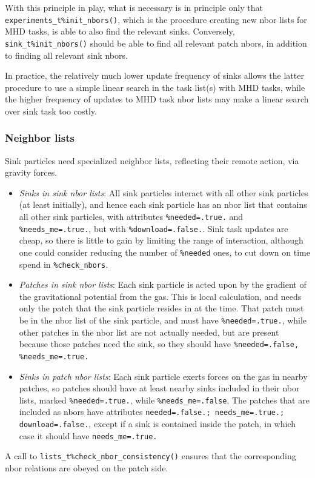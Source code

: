 \documentclass[paper=a4,fontsize=11pt]{scrartcl}
\numberwithin{equation}{section}		%
\numberwithin{figure}{section}			%
\numberwithin{table}{section}				%
\newcommand{\codecolor}{\color{Blue}}
\newcommand{\Code}[1]{{\codecolor\texttt{#1}}}
\begin{document}
With this principle in play, what is necessary is in principle only that \Code{experiments\_t\%init\_nbors()}, which is the procedure creating new nbor lists for MHD tasks, is able to also find the relevant sinks.  Conversely, \Code{sink\_t\%init\_nbors()} should be able to find all relevant patch nbors, in addition to finding all relevant sink nbors.

In practice, the relatively much lower update frequency of sinks allows the latter procedure to use a simple linear search in the task list(s) with MHD tasks, while the higher frequency of updates to MHD task nbor lists may make a linear search over sink task too costly.

\subsubsection{Neighbor lists}
Sink particles need specialized neighbor lists, reflecting their remote action, via gravity forces.  
\begin{itemize}
    \item \textit{Sinks in sink nbor lists}: All sink particles interact with all other sink particles (at least initially), and hence each sink particle has an nbor list that contains all other sink particles, with attributes \verb|%needed=.true.| and \verb|%needs_me=.true.|, but with \verb|%download=.false.|.  Sink task updates are cheap, so there is little to gain by limiting the range of interaction, although one could consider reducing the number of \verb|%needed| ones, to cut down on time spend in \verb|%check_nbors|.
    \item \textit{Patches in sink nbor lists}: Each sink particle is acted upon by the gradient of the gravitational potential from the gas.  This is local calculation, and needs only the patch that the sink particle resides in at the time.  That patch must be in the nbor list of the sink particle, and must have \verb|%needed=.true.|, while other patches in the nbor list are not actually needed, but are present because those patches need the sink, so they should have \verb|%needed=.false, %needs_me=.true.|
    \item \textit{Sinks in patch nbor lists}: Each sink particle exerts forces on the gas in nearby patches, so patches should have at least nearby sinks included in their nbor lists, marked \verb|%needed=.true.|, while \verb|%needs_me=.false|, The patches that are included as nbors have attributes \verb|needed=.false.; needs_me=.true.; download=.false.|, except if a sink is contained inside the patch, in which case it should have \verb|needs_me=.true.|
\end{itemize}
A call to \Code{lists\_t\%check\_nbor\_consistency()} ensures that the corresponding nbor relations are obeyed on the patch side.  
\end{document}
